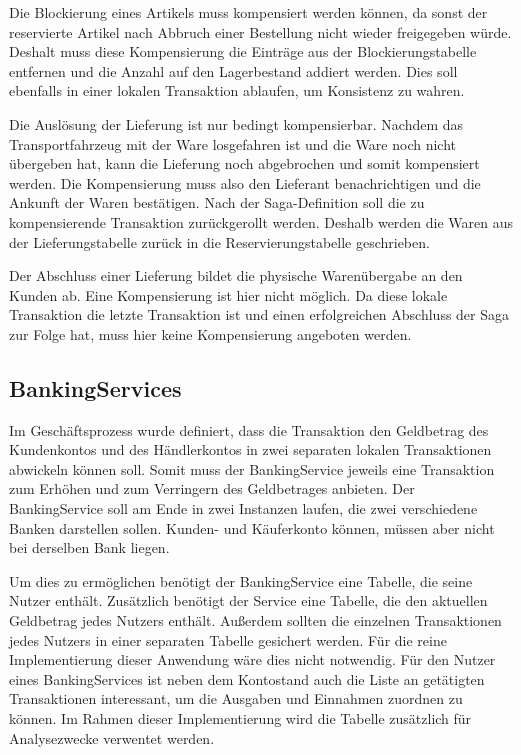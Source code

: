 Die Blockierung eines Artikels muss kompensiert werden können, da sonst der reservierte Artikel nach Abbruch einer Bestellung nicht wieder freigegeben würde. Deshalt muss diese Kompensierung die Einträge aus der Blockierungstabelle entfernen und die Anzahl auf den Lagerbestand addiert werden. Dies soll ebenfalls in einer lokalen Transaktion ablaufen, um Konsistenz zu wahren.

Die Auslösung der Lieferung ist nur bedingt kompensierbar. Nachdem das Transportfahrzeug mit der Ware losgefahren ist und die Ware noch nicht übergeben hat, kann die Lieferung noch abgebrochen und somit kompensiert werden. Die Kompensierung muss also den Lieferant benachrichtigen und die Ankunft der Waren bestätigen. Nach der Saga-Definition soll die zu kompensierende Transaktion zurückgerollt werden. Deshalb werden die Waren aus der Lieferungstabelle zurück in die Reservierungstabelle geschrieben. 

Der Abschluss einer Lieferung bildet die physische Warenübergabe an den Kunden ab. Eine Kompensierung ist hier nicht möglich. Da diese lokale Transaktion die letzte Transaktion ist und einen erfolgreichen Abschluss der Saga zur Folge hat, muss hier keine Kompensierung angeboten werden.

\subsection{BankingServices}
Im Geschäftsprozess wurde definiert, dass die Transaktion den Geldbetrag des Kundenkontos und des Händlerkontos in zwei separaten lokalen Transaktionen abwickeln können soll. Somit muss der BankingService jeweils eine Transaktion zum Erhöhen und zum Verringern des Geldbetrages anbieten. Der BankingService soll am Ende in zwei Instanzen laufen, die zwei verschiedene Banken darstellen sollen. Kunden- und Käuferkonto können, müssen aber nicht bei derselben Bank liegen. 

Um dies zu ermöglichen benötigt der BankingService eine Tabelle, die seine Nutzer enthält. Zusätzlich benötigt der Service eine Tabelle, die den aktuellen Geldbetrag jedes Nutzers enthält. Außerdem sollten die einzelnen Transaktionen jedes Nutzers in einer separaten Tabelle gesichert werden. Für die reine Implementierung dieser Anwendung wäre dies nicht notwendig. Für den Nutzer eines BankingServices ist neben dem Kontostand auch die Liste an getätigten Transaktionen interessant, um die Ausgaben und Einnahmen zuordnen zu können. Im Rahmen dieser Implementierung wird die Tabelle zusätzlich für Analysezwecke verwentet werden.
 
